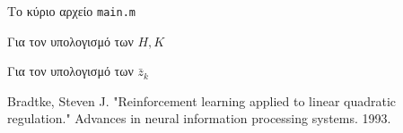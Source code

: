 \documentclass[a4paper,oneside,12pt]{article}
\begin{document}
Το κύριο αρχείο \texttt{main.m}



Για τον υπολογισμό των $H, K$



Για τον υπολογισμό των $\bar z_k$




\begin{thebibliography}{9}

 Bradtke, Steven J. "Reinforcement learning applied to linear quadratic regulation." Advances in neural information processing systems. 1993.

\end{thebibliography}
\end{document}
